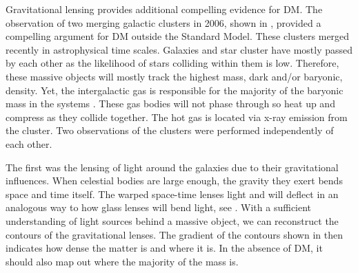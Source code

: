 \begin{figure}[ht]
\end{figure}

Gravitational lensing provides additional compelling evidence for DM.
The observation of two merging galactic clusters in 2006, shown in , provided a compelling argument for DM outside the Standard Model.
These clusters merged recently in astrophysical time scales.
Galaxies and star cluster have mostly passed by each other as the likelihood of stars colliding within them is low.
Therefore, these massive objects will mostly track the highest mass, dark and/or baryonic, density.
Yet, the intergalactic gas is responsible for the majority of the baryonic mass in the systems \cite{Hooper:DMHistory}.
These gas bodies will not phase through so heat up and compress as they collide together.
The hot gas is located via x-ray emission from the cluster.
Two observations of the clusters were performed independently of each other.

The first was the lensing of light around the galaxies due to their gravitational influences.
When celestial bodies are large enough, the gravity they exert bends space and time itself.
The warped space-time lenses light and will deflect in an analogous way to how glass lenses will bend light, see .
With a sufficient understanding of light sources behind a massive object, we can reconstruct the contours of the gravitational lenses.
The gradient of the contours shown in  then indicates how dense the matter is and where it is.
In the absence of DM, it should also map out where the majority of the mass is.

